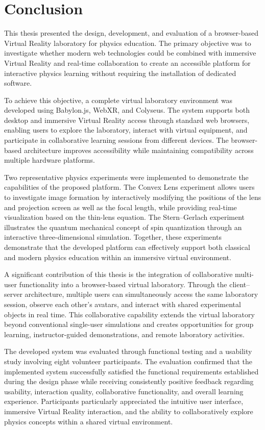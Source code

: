 \chapter{Conclusion}

This thesis presented the design, development, and evaluation of a browser-based Virtual Reality laboratory for physics education. The primary objective was to investigate whether modern web technologies could be combined with immersive Virtual Reality and real-time collaboration to create an accessible platform for interactive physics learning without requiring the installation of dedicated software.

To achieve this objective, a complete virtual laboratory environment was developed using Babylon.js, WebXR, and Colyseus. The system supports both desktop and immersive Virtual Reality access through standard web browsers, enabling users to explore the laboratory, interact with virtual equipment, and participate in collaborative learning sessions from different devices. The browser-based architecture improves accessibility while maintaining compatibility across multiple hardware platforms.

Two representative physics experiments were implemented to demonstrate the capabilities of the proposed platform. The Convex Lens experiment allows users to investigate image formation by interactively modifying the positions of the lens and projection screen as well as the focal length, while providing real-time visualization based on the thin-lens equation. The Stern--Gerlach experiment illustrates the quantum mechanical concept of spin quantization through an interactive three-dimensional simulation. Together, these experiments demonstrate that the developed platform can effectively support both classical and modern physics education within an immersive virtual environment.

A significant contribution of this thesis is the integration of collaborative multi-user functionality into a browser-based virtual laboratory. Through the client--server architecture, multiple users can simultaneously access the same laboratory session, observe each other's avatars, and interact with shared experimental objects in real time. This collaborative capability extends the virtual laboratory beyond conventional single-user simulations and creates opportunities for group learning, instructor-guided demonstrations, and remote laboratory activities.

The developed system was evaluated through functional testing and a usability study involving eight volunteer participants. The evaluation confirmed that the implemented system successfully satisfied the functional requirements established during the design phase while receiving consistently positive feedback regarding usability, interaction quality, collaborative functionality, and overall learning experience. Participants particularly appreciated the intuitive user interface, immersive Virtual Reality interaction, and the ability to collaboratively explore physics concepts within a shared virtual environment.

